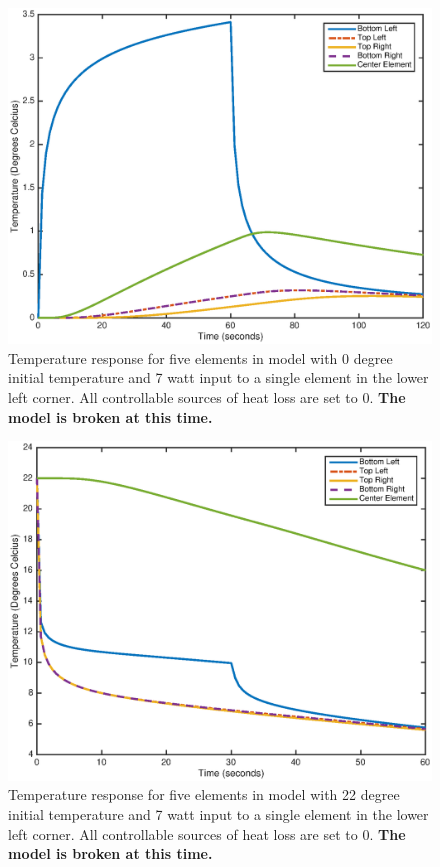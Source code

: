 \documentclass[10pt,twocolumn]{article}
\begin{document}
\begin{figure}
	\center
	\includegraphics[width=0.8\linewidth]{TempResponse0.eps}
	\caption{Temperature response for five elements in model with 0 degree initial temperature and 7 watt input to a single element in the lower left corner. All controllable sources of heat loss are set to 0. \textbf{The model is broken at this time.}}
	\label{fig:TempResponse0}
\end{figure}

\begin{figure}
	\center
	\includegraphics[width=0.8\linewidth]{TempResponse22.eps}
	\caption{Temperature response for five elements in model with 22 degree initial temperature and 7 watt input to a single element in the lower left corner. All controllable sources of heat loss are set to 0. \textbf{The model is broken at this time.}}
	\label{fig:TempRespsonse22}
\end{figure}
\end{document}
